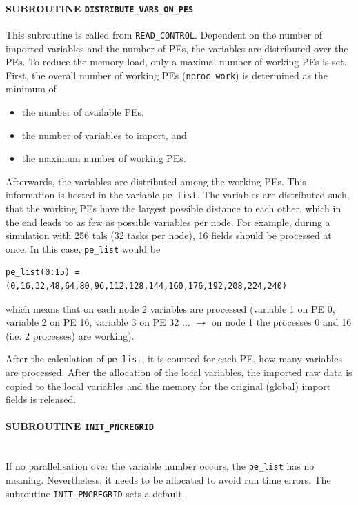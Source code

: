 \documentclass[11pt,twoside]{report}
\begin{document}
\paragraph{SUBROUTINE \color{blue} \tt\bf DISTRIBUTE\_VARS\_ON\_PES\label{IFDVOPE}\\}
This subroutine is called from \verb|READ_CONTROL|. Dependent on the number
of imported variables and the number of PEs, the variables are distributed
over the PEs. To reduce the memory load, only a maximal number of working
PEs is set.
First, the overall number of working PEs (\verb|nproc_work|) is determined
as the minimum of 
\begin{itemize}
\item the number of available PEs, 
\item the number of variables to import, and
\item the maximum number of working PEs.
\end{itemize}
Afterwards, the variables are distributed among the working PEs. This
information is 
hosted in the variable \verb|pe_list|. The variables are distributed such, 
that the working PEs have the largest possible distance to each other,
which in the end leads to as few as possible variables per node.
For example, during a simulation with 256 tals (32 tasks per node), 16
fields should be  processed at once. In this case, \verb|pe_list| would be
\begin{verbatim}
pe_list(0:15) = (0,16,32,48,64,80,96,112,128,144,160,176,192,208,224,240)
\end{verbatim}
which means that on each node 2 variables are processed (variable 1 on PE 0, 
variable 2 on PE 16, variable 3 on PE 32 ... $\rightarrow$ on node 1
the processes 0 and 16 (i.e. 2 processes) are working).

After the calculation of \verb|pe_list|, it is counted for each PE,
how many variables are processed. After the allocation of the
local variables, the imported raw data is copied to the local variables
and the memory for the original (global) import fields is released.


\paragraph{SUBROUTINE \color{blue} \tt\bf INIT\_PNCREGRID\\ \label{IGPARINITPNCREGRID} }
If no parallelisation over the variable number occurs, the \verb|pe_list|
has no meaning. Nevertheless, it needs to be allocated to avoid
run time errors. The subroutine \verb|INIT_PNCREGRID| sets a default.
\end{document}
